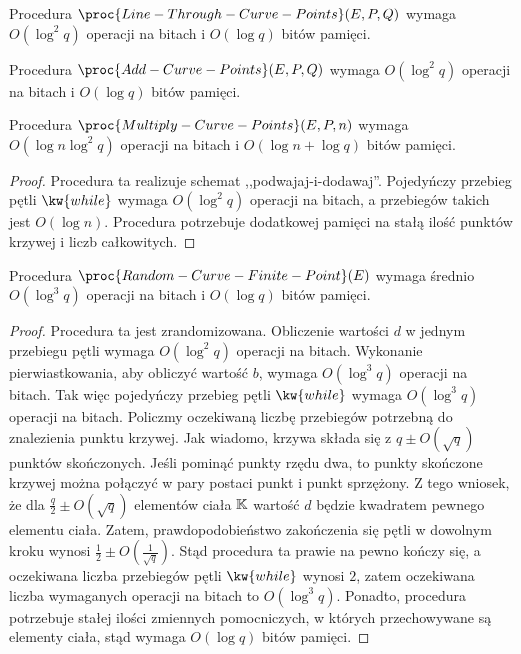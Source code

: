\begin{fact}
Procedura $\proc{Line-Through-Curve-Points}(E, P, Q)$ wymaga
$O(\log^2 q)$ operacji na bitach i $O(\log q)$ bitów pamięci.
\end{fact}

\begin{fact}
Procedura $\proc{Add-Curve-Points}(E, P, Q)$ wymaga
$O(\log^2 q)$ operacji na bitach i $O(\log q)$ bitów pamięci.
\end{fact}

\begin{lemma}
Procedura $\proc{Multiply-Curve-Points}(E, P, n)$ wymaga
$O(\log n \log^2 q)$ operacji na bitach i $O(\log n + \log q)$ bitów pamięci.
\end{lemma}

\begin{proof}
Procedura ta realizuje schemat ,,podwajaj-i-dodawaj''.
Pojedyńczy przebieg pętli $\kw{while}$ wymaga
$O(\log^2 q)$ operacji na bitach,
a przebiegów takich jest $O(\log n)$.
Procedura potrzebuje dodatkowej pamięci na stałą ilość
punktów krzywej i liczb całkowitych.
\end{proof}

\begin{lemma}
Procedura $\proc{Random-Curve-Finite-Point}(E)$ wymaga
średnio $O(\log^3 q)$ operacji na bitach i $O(\log q)$ bitów pamięci.
\end{lemma}

\begin{proof}
Procedura ta jest zrandomizowana.
Obliczenie wartości $d$ w jednym przebiegu pętli wymaga
$O(\log^2 q)$ operacji na bitach.
Wykonanie pierwiastkowania, aby obliczyć wartość $b$, wymaga
$O(\log^3 q)$ operacji na bitach.
Tak więc pojedyńczy przebieg pętli $\kw{while}$ wymaga
$O(\log^3 q)$ operacji na bitach.
Policzmy oczekiwaną liczbę przebiegów potrzebną do znalezienia punktu krzywej.
Jak wiadomo, krzywa składa się z $q \pm O(\sqrt{q})$ punktów skończonych.
Jeśli pominąć punkty rzędu dwa,
to punkty skończone krzywej można połączyć w pary postaci
punkt i punkt sprzężony.
Z tego wniosek, że dla $\frac{q}{2} \pm O(\sqrt{q})$ elementów ciała $\mathbb{K}$
wartość $d$ będzie kwadratem pewnego elementu ciała.
Zatem, prawdopodobieństwo zakończenia się pętli w dowolnym kroku
wynosi $\frac{1}{2} \pm O(\frac{1}{\sqrt{q}})$.
Stąd procedura ta prawie na pewno kończy się,
a oczekiwana liczba przebiegów pętli $\kw{while}$ wynosi $2$,
zatem oczekiwana liczba wymaganych operacji na bitach to $O(\log^3 q)$.
Ponadto, procedura potrzebuje stałej ilości zmiennych pomocniczych,
w których przechowywane są elementy ciała,
stąd wymaga $O(\log q)$ bitów pamięci.
\end{proof}

